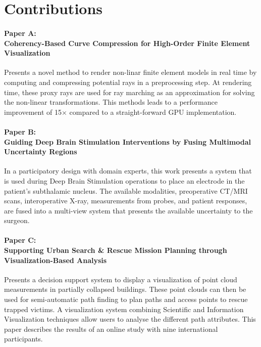 \chapter*{Contributions}

\subsubsection{Paper A:\\Coherency-Based Curve Compression for High-Order Finite Element Visualization}
Presents a novel method to render non-linar finite element models in real time by computing and compressing potential rays in a preprocessing step. At rendering time, these proxy rays are used for ray marching as an approximation for solving the non-linear transformations. This methods leads to a performance improvement of 15$\times$ compared to a straight-forward GPU implementation.%

\subsubsection{Paper B:\\Guiding Deep Brain Stimulation Interventions by Fusing Multimodal Uncertainty Regions}
In a participatory design with domain experts, this work presents a system that is used during Deep Brain Stimulation operations to place an electrode in the patient's subthalamic nucleus. The available modalities, preoperative CT/MRI scans, interoperative X-ray, measurements from probes, and patient responses, are fused into a multi-view system that presents the available uncertainty to the surgeon.%

\subsubsection{Paper C:\\Supporting Urban Search \& Rescue Mission Planning through \\Visualization-Based Analysis}
Presents a decision support system to display a  visualization of point cloud measurements in partially collapsed buildings. These point clouds can then be used for semi-automatic path finding to plan paths and access points to rescue trapped victims. A visualization system combining Scientific and Information Visualization techniques allow users to analyse the different path attributes. This paper describes the results of an online study with nine international participants.%

